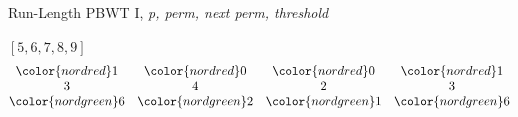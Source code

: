 \documentclass{beamer}
\begin{document}
\begin{frame}{Run-Length PBWT I, \textit{p, perm, next perm, threshold}}
\begin{block}{$[5,6,7,8,9]$}
{{\[\begin{matrix}
                    \color{nordred} 1 &  \color{nordred} 0 &  \color{nordred} 0 &
                                                                                                                                                                        \color{nordred} 1\\ 
                    3 & 4 & 2 & 3\\
                    \color{nordgreen} 6 & \color{nordgreen} 2 & \color{nordgreen} 1 &
                                                                                                                                                                                \color{nordgreen} 6           
                                                                                                                                                                                \end{matrix}\]}}
                                                                                                                                                                                \end{block}
                                                                                                                                                                                \end{frame}
\end{document}
